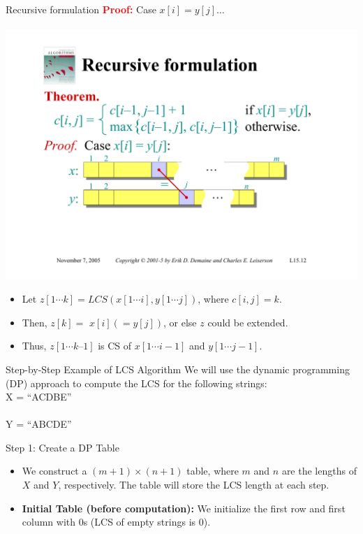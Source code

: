 \documentclass{beamer}
\begin{document}
\begin{frame}{Recursive formulation}
    \textcolor{red}{\textbf{Proof:}} Case $x[i] = y[j] \ldots$ \\
    \\
    \includegraphics[width=\textwidth,trim=3cm 5cm 3cm 10.50cm, clip]{figures/proof01.pdf}
    \begin{itemize}
        \item Let $z[1 \cdots k] = LCS(x[1 \cdots i], y[1 \cdots j])$, where $c[i, j] = k$. \pause
        \item Then, $z[k] =$ \pause $x[i] ( = y[j])$\pause, or else $z$ could be extended. \pause
        \item Thus, $z[1 \cdots k–1]$ is CS of $x[1 \cdots i - 1]$ and $y[1 \cdots j - 1]$.
    \end{itemize}
\end{frame}

\begin{frame}{Step-by-Step Example of LCS Algorithm}
    We will use the dynamic programming (DP) approach to compute the LCS for the following strings:\\

    {\Huge X = ``ACDBE''} \\
    \\
    {\Huge Y = ``ABCDE''}
\end{frame}

\begin{frame}{Step 1: Create a DP Table}
    \begin{itemize}
        \item We construct a $(m+1) \times (n+1)$ table, where $m$ and $n$ are the lengths of $X$ and $Y$, respectively. The table will store the LCS length at each step.
        \item \textbf{Initial Table (before computation):} We initialize the first row and first column with 0s (LCS of empty strings is 0).
    \end{itemize}
\end{frame}
\end{document}
